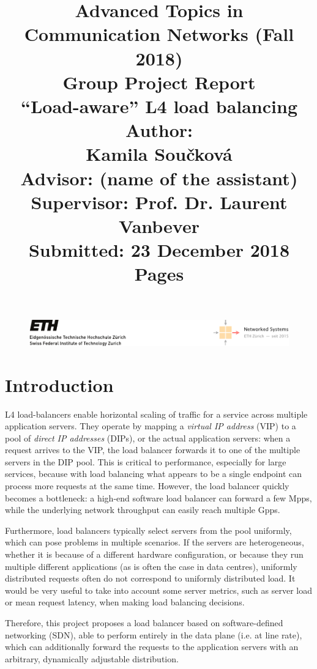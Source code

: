 \documentclass[11pt,oneside,a4paper]{article}
\title{
    \vspace*{0.0mm}
    \LARGE\bf\sf Advanced Topics in \\Communication Networks (Fall 2018)
    \vspace*{10.0mm} \\
    \Large\bf\sf Group Project Report \vspace*{30.0mm}\\
    \Huge\bf\sf ``Load-aware'' L4 load balancing
    \vspace*{30.0mm} \\
    \normalsize
    \sf Author:\\[5pt]
    \sf Kamila Sou\v{c}kov\'{a} \\ [5pt]
    \sf  Advisor:  (name of the assistant) \vspace*{5mm}\\
    \sf  Supervisor:  Prof. Dr. Laurent Vanbever \vspace*{20.0mm}\\
    \sf Submitted: 23 December 2018\\ [5pt]
    \sf \pageref{lastpage} Pages
}
\date{}
\begin{document}
\begin{figure}
    \includegraphics[width=\textwidth]{figures/eth-nsg-header}
\end{figure}

\maketitle
\thispagestyle{empty}
\raggedbottom
\clearpage


\begin{abstract}
    \lipsum[1-3]
\end{abstract}

\clearpage
\setcounter{tocdepth}{2}
\tableofcontents
\clearpage
{}

\section{Introduction}
L4 load-balancers enable horizontal scaling of traffic for a service across
multiple application servers.
They operate by mapping a \emph{virtual IP address} (VIP) to a pool of
\emph{direct IP addresses} (DIPs), or the actual application servers: when a
request arrives to the VIP, the load balancer forwards it to one of the multiple
servers in the DIP pool.
This is critical to performance, especially for large services, because with
load balancing what appears to be a single endpoint can process more requests at
the same time.
However, the load balancer quickly becomes a bottleneck: a high-end software
load balancer can forward a few Mpps, while the underlying network throughput
can easily reach multiple Gpps.\cite{maglev}

Furthermore, load balancers typically select servers from the pool uniformly,
which can pose problems in multiple scenarios.  If the servers are
heterogeneous, whether it is because of a different hardware configuration, or
because they run multiple different applications (as is often the case in data
centres), uniformly distributed requests often do not correspond to uniformly
distributed load.
It would be very useful to take into account some server metrics, such as server
load or mean request latency, when making load balancing decisions.

Therefore, this project proposes a load balancer based on software-defined
networking (SDN), able to perform entirely in the data plane (i.e. at line
rate), which can additionally forward the requests to the application servers
with an arbitrary, dynamically adjustable distribution.
\end{document}
